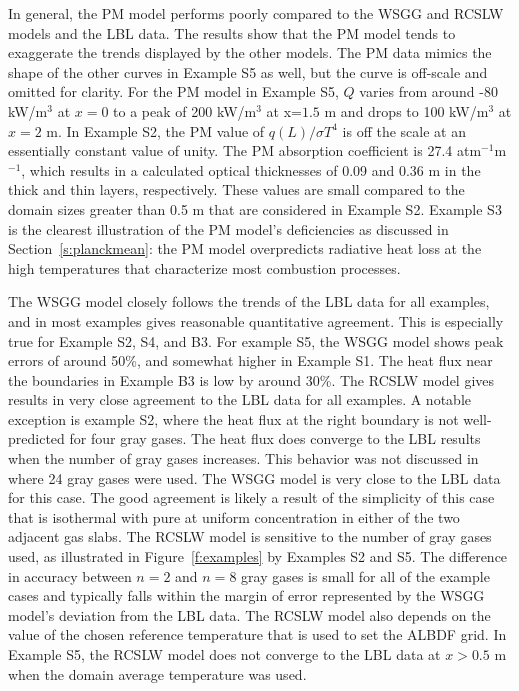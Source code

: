 \documentclass[preprint,12pt]{elsarticle}
\begin{document}
In general, the PM model performs poorly compared to the WSGG and RCSLW models and the LBL data. The results show that the PM model tends to exaggerate the trends displayed by the other models. The PM data mimics the shape of the other curves in Example S5 as well, but the curve is off-scale and omitted for clarity. For the PM model in Example S5, $Q$ varies from around -80 kW/m$^3$ at $x=0$ to a peak of 200 kW/m$^3$ at x=$1.5$ m and drops to 100 kW/m$^3$ at $x=2$ m. 
In Example S2, the PM value of $q(L)/\sigma T^4$ is off the scale at an essentially constant value of unity. The PM absorption coefficient is 27.4 atm$^{-1}$m$^{-1}$, which results in a calculated optical thicknesses of 0.09 and 0.36 m in the thick and thin layers, respectively. These values are small compared to the domain sizes greater than 0.5 m that are considered in Example S2.
Example S3 is the clearest illustration of the PM model's deficiencies as discussed in Section~\ref{s:planckmean}: the PM model overpredicts radiative heat loss at the high temperatures that characterize most combustion processes. 

The WSGG model closely follows the trends of the LBL data for all examples, and in most examples gives reasonable quantitative agreement. This is especially true for Example S2, S4, and B3. For example S5, the WSGG model shows peak errors of around 50\%, and somewhat higher in Example S1. The heat flux near the boundaries in Example B3 is low by around 30\%. The RCSLW model gives results in very close agreement to the LBL data for all examples. A notable exception is example S2, where the heat flux at the right boundary is not well-predicted for four gray gases. The heat flux does converge to the LBL results when the number of gray gases increases. This behavior was not discussed in \cite{Solovjov_2017} where 24 gray gases were used. The WSGG model is very close to the LBL data for this case. The good agreement is likely a result of the simplicity of this case that is isothermal with pure  at uniform concentration in either of the two adjacent gas slabs.
The RCSLW model is sensitive to the number of gray gases used, as illustrated in Figure~\ref{f:examples} by Examples S2 and S5. The difference in accuracy between $n=2$ and $n=8$ gray gases is small for all of the example cases and typically falls within the margin of error represented by the WSGG model's deviation from the LBL data. 
The RCSLW model also depends on the value of the chosen reference temperature that is used to set the ALBDF grid. In Example S5, the RCSLW model does not converge to the LBL data at $x>0.5$ m when the domain average temperature was used.
\end{document}
